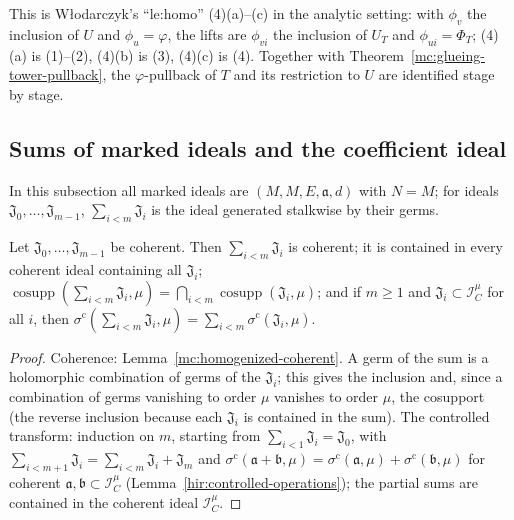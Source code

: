 This is Włodarczyk's ``le:homo'' (4)(a)--(c) in the analytic setting: with \(\phi_v\) the inclusion of \(U\) and \(\phi_u=\varphi\), the lifts are
\(\phi_{vi}\) the inclusion of \(U_T\) and \(\phi_{ui}=\Phi_T\); (4)(a) is (1)--(2), (4)(b) is (3), (4)(c) is (4). Together with
Theorem~\ref{mc:glueing-tower-pullback}, the \(\varphi\)-pullback of \(T\) and its restriction to \(U\) are identified stage by stage.

\subsection{Sums of marked ideals and the coefficient ideal}

In this subsection all marked ideals are \((M,M,E,\mathfrak a,d)\) with \(N=M\); for ideals \(\mathfrak J_0,\dots,\mathfrak J_{m-1}\),
\(\sum_{i<m}\mathfrak J_i\) is the ideal generated stalkwise by their germs.

\begin{lemma}
\label{mc:finite-sum}
\leanok
Let \(\mathfrak J_0,\dots,\mathfrak J_{m-1}\) be coherent. Then \(\sum_{i<m}\mathfrak J_i\) is coherent; it is contained in every coherent ideal containing all
\(\mathfrak J_i\); \(\operatorname{cosupp}(\sum_{i<m}\mathfrak J_i,\mu)=\bigcap_{i<m}\operatorname{cosupp}(\mathfrak J_i,\mu)\); and if \(m\ge1\) and
\(\mathfrak J_i\subset\mathcal I_C^\mu\) for all \(i\), then \(\sigma^{\mathrm c}(\sum_{i<m}\mathfrak J_i,\mu)=\sum_{i<m}\sigma^{\mathrm c}(\mathfrak J_i,\mu)\).
\end{lemma}
\begin{proof}
\leanok
Coherence: Lemma~\ref{mc:homogenized-coherent}. A germ of the sum is a holomorphic combination of germs of the \(\mathfrak J_i\); this gives the
inclusion and, since a combination of germs vanishing to order \(\mu\) vanishes to order \(\mu\), the cosupport (the reverse inclusion because each
\(\mathfrak J_i\) is contained in the sum). The controlled transform: induction on \(m\), starting from \(\sum_{i<1}\mathfrak J_i=\mathfrak J_0\), with
\(\sum_{i<m+1}\mathfrak J_i=\sum_{i<m}\mathfrak J_i+\mathfrak J_m\) and \(\sigma^{\mathrm c}(\mathfrak a+\mathfrak b,\mu)=\sigma^{\mathrm c}(\mathfrak a,\mu)+\sigma^{\mathrm c}(\mathfrak b,\mu)\)
for coherent \(\mathfrak a,\mathfrak b\subset\mathcal I_C^\mu\) (Lemma~\ref{hir:controlled-operations}); the partial sums are contained in the coherent ideal \(\mathcal I_C^\mu\).
\end{proof}


